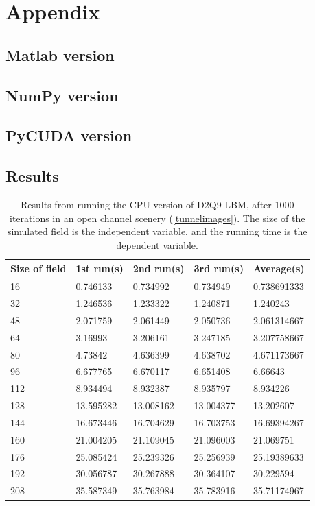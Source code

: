 \section{Appendix}

\subsection{Matlab version}


\newpage
\subsection{NumPy version}


\newpage
\subsection{PyCUDA version}



\subsection{Results}
\begin{table}[H]
\centering
\begin{tabular}{lllll}
\toprule
Size	 of field &1st run(s)&	2nd run(s)&	3rd run(s) &	Average(s)\\
\midrule
16&	0.746133&	0.734992&	0.734949&	0.738691333\\
32&	1.246536&	1.233322&	1.240871&	1.240243\\
48&	2.071759&	2.061449&	2.050736&	2.061314667\\
64&	3.16993&		3.206161&	3.247185&	3.207758667\\
80&	4.73842&		4.636399&	4.638702&	4.671173667\\
96&	6.677765&	6.670117&	6.651408&	6.66643\\
112&	8.934494&	8.932387&	8.935797&	8.934226\\
128&	13.595282&	13.008162&	13.004377&	13.202607\\
144&	16.673446&	16.704629&	16.703753&	16.69394267\\
160&	21.004205&	21.109045&	21.096003&	21.069751\\
176&	25.085424&	25.239326&	25.256939&	25.19389633\\
192&	30.056787&	30.267888&	30.364107&	30.229594\\
208&	35.587349&	35.763984&	35.783916&	35.71174967\\
\bottomrule
\end{tabular}
\caption{Results from running the CPU-version of D2Q9 LBM, after 1000 iterations in an open channel scenery (\autoref{tunnelimages}). The size of the simulated field is the independent variable, and the running time is the dependent variable.}
\label{resultcpu}
\end{table}


